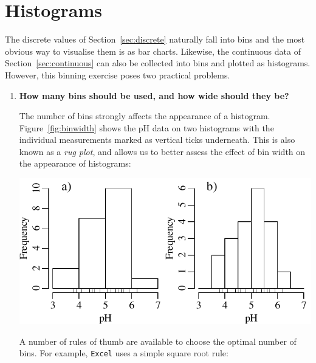 \section{Histograms}\label{sec:histogram}

The discrete values of Section~\ref{sec:discrete} naturally fall into
bins and the most obvious way to visualise them is as bar charts.
Likewise, the continuous data of Section~\ref{sec:continuous} can also
be collected into bins and plotted as histograms. However, this
binning exercise poses two practical problems.

\begin{enumerate}

\item\textbf{How many bins should be used, and how wide should they be?}

  The number of bins strongly affects the appearance of a histogram.
  Figure~\ref{fig:binwidth} shows the pH data on two histograms with
  the individual measurements marked as vertical ticks
  underneath. This is also known as a \emph{rug plot}, and allows us
  to better assess the effect of bin width on the appearance of
  histograms:
  
  \noindent\begin{minipage}[t][][b]{.55\linewidth}
  \includegraphics[width=\textwidth]{../figures/binwidth.pdf}\medskip
  \end{minipage}
  \begin{minipage}[t][][t]{.45\linewidth}
    \label{fig:binwidth}
  \end{minipage}

  A number of rules of thumb are available to choose the optimal number
  of bins. For example, \texttt{Excel} uses a simple square root rule:


\end{enumerate}
